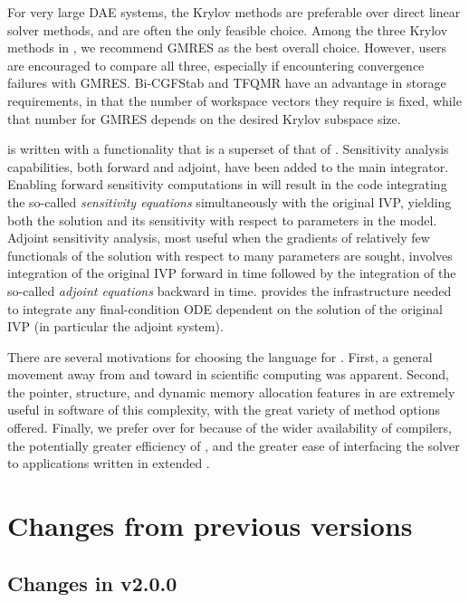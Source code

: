 For very large DAE systems, the Krylov methods are preferable over
direct linear solver methods, and are often the only feasible choice.
Among the three Krylov methods in {\idas}, we recommend GMRES as the
best overall choice.  However, users are encouraged to compare all
three, especially if encountering convergence failures with GMRES.
Bi-CGFStab and TFQMR have an advantage in storage requirements, in
that the number of workspace vectors they require is fixed, while that
number for GMRES depends on the desired Krylov subspace size.

{\idas} is written with a functionality that is a superset of that
of {\ida}. Sensitivity analysis capabilities, both
forward and adjoint, have been added to the main integrator. Enabling
forward sensitivity computations in {\idas} will result in the
code integrating the so-called {\em sensitivity equations}
simultaneously with the original IVP, yielding both the solution and
its sensitivity with respect to parameters in the model. Adjoint
sensitivity analysis, most useful when the gradients of relatively few
functionals of the solution with respect to many parameters are
sought, involves integration of the original IVP forward in time
followed by the integration of the so-called {\em adjoint equations}
backward in time. {\idas} provides the infrastructure needed to
integrate any final-condition ODE dependent on the solution of the
original IVP (in particular the adjoint system).

There are several motivations for choosing the {\CC} language for {\idas}.
First, a general movement away from {\F} and toward {\CC} in scientific
computing was apparent.  Second, the pointer, structure, and dynamic
memory allocation features in {\CC} are extremely useful in software of
this complexity, with the great variety of method options offered.
Finally, we prefer {\CC} over {\CPP} for {\idas} because of the wider
availability of {\CC} compilers, the potentially greater efficiency of {\CC},
and the greater ease of interfacing the solver to applications written
in extended {\F}.


\section{Changes from previous versions}

\subsection*{Changes in v2.0.0}

